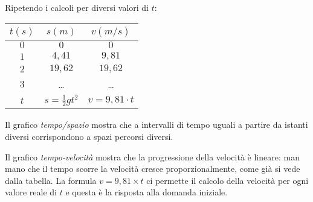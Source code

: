 \noindent \begin{minipage}{0.35\textwidth}
Ripetendo i calcoli per diversi valori di \(t\):
 \begin{center}
\begin{tabular}{ccc}\toprule
\(t (s)\)      & \(s (m)\) & \(v(m/s)\)  \\\midrule
\(0\)      & \(0\)                 & \(0\)  \\
\(1\)      & \(4,41\)              & \(9,81\) \\
\(2\)      & \(19,62\)             & \(19,62\) \\
\(3\)      & \dots                 & \dots \\
\(t\)      & \(s=\frac{1}{2}gt^2\) & \(v=9,81 \cdot t\) \\\bottomrule
\end{tabular}
\label{tab:diff_velocita}
\end{center}
 \end{minipage}
  \hfill
 \begin{minipage}{.63 \textwidth}
 \end{minipage}

Il grafico \emph{tempo/spazio} mostra che a intervalli di tempo uguali 
a partire da istanti diversi corrispondono a spazi percorsi diversi. 

Il grafico \emph{tempo-velocità} mostra che la progressione della velocità 
è lineare: man mano che il tempo scorre la velocità cresce 
proporzionalmente, come già si vede dalla tabella.
La formula \(v=9,81\times t\) ci permette il calcolo della velocità per 
ogni valore reale di \(t\) e questa è la risposta alla domanda iniziale. 

% 

